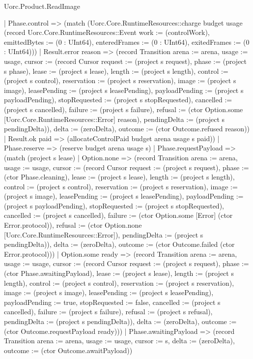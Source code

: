 \begin{lexlean}{Uorc.Product.ReadImage}
\begin{semanticmodule}
{        | Phase.control => (match (Uorc.Core.RuntimeResources::charge budget usage (record Uorc.Core.RuntimeResources::Event {work := (controlWork), emittedBytes := (0 : UInt64), enteredFrames := (0 : UInt64), exitedFrames := (0 : UInt64)}))
          | Result.error reason => (record Transition {arena := arena, usage := usage, cursor := (record Cursor {request := (project s request), phase := (project s phase), lease := (project s lease), length := (project s length), control := (project s control), reservation := (project s reservation), image := (project s image), leasePending := (project s leasePending), payloadPending := (project s payloadPending), stopRequested := (project s stopRequested), cancelled := (project s cancelled), failure := (project s failure), refusal := (ctor Option.some [Uorc.Core.RuntimeResources::Error] reason), pendingDelta := (project s pendingDelta)}), delta := (zeroDelta), outcome := (ctor Outcome.refused reason)})
          | Result.ok paid => (allocateControlPaid budget arena usage s paid))
        | Phase.reserve => (reserve budget arena usage s)
        | Phase.requestPayload => (match (project s lease)
          | Option.none => (record Transition {arena := arena, usage := usage, cursor := (record Cursor {request := (project s request), phase := (ctor Phase.cleaning), lease := (project s lease), length := (project s length), control := (project s control), reservation := (project s reservation), image := (project s image), leasePending := (project s leasePending), payloadPending := (project s payloadPending), stopRequested := (project s stopRequested), cancelled := (project s cancelled), failure := (ctor Option.some [Error] (ctor Error.protocol)), refusal := (ctor Option.none [Uorc.Core.RuntimeResources::Error]), pendingDelta := (project s pendingDelta)}), delta := (zeroDelta), outcome := (ctor Outcome.failed (ctor Error.protocol))})
          | Option.some ready => (record Transition {arena := arena, usage := usage, cursor := (record Cursor {request := (project s request), phase := (ctor Phase.awaitingPayload), lease := (project s lease), length := (project s length), control := (project s control), reservation := (project s reservation), image := (project s image), leasePending := (project s leasePending), payloadPending := true, stopRequested := false, cancelled := (project s cancelled), failure := (project s failure), refusal := (project s refusal), pendingDelta := (project s pendingDelta)}), delta := (zeroDelta), outcome := (ctor Outcome.requestPayload ready)}))
        | Phase.awaitingPayload => (record Transition {arena := arena, usage := usage, cursor := s, delta := (zeroDelta), outcome := (ctor Outcome.awaitPayload)})
}
\end{semanticmodule}
\end{lexlean}
